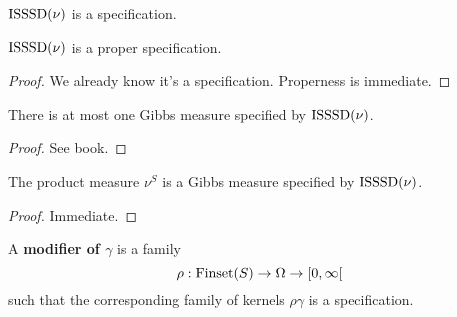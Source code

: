 \begin{definition}
    \label{def:isssd-spec}
    \leanok

    $\operatorname{ISSSD}(\nu)$ is a specification.
\end{definition}

\begin{lemma}
    \label{lem:isssd-proper-spec}
    \leanok

    $\operatorname{ISSSD}(\nu)$ is a proper specification.
\end{lemma}
\begin{proof}

    We already know it's a specification. Properness is immediate.
\end{proof}

\begin{lemma}
    \label{lem:isssd-gibbs-meas-uniqueness}

    There is at most one Gibbs measure specified by $\operatorname{ISSSD}(\nu)$.
\end{lemma}
\begin{proof}

    See book.
\end{proof}

\begin{lemma}
    \label{lem:isssd-gibbs-meas-existence}
    \leanok{}

    The product measure $\nu^S$ is a Gibbs measure specified by $\operatorname{ISSSD}(\nu)$.
\end{lemma}
\begin{proof}

   Immediate.
\end{proof}

\begin{definition}[Modifier]
    \label{def:modif}
    \leanok{}

    A {\bf modifier of $\gamma$} is a family
    \[\rho : \operatorname{Finset}(S) \to \Omega \to [0, \infty[\]
    such that the corresponding family of kernels $\rho\gamma$ is a specification.
\end{definition}

